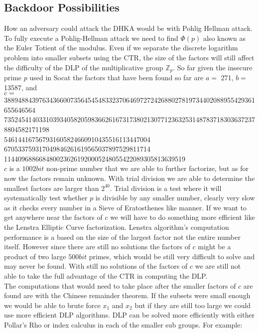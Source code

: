 \documentclass[letterpaper,11pt,notitlepage,fleqn]{article}
\begin{document}
\subsection{Backdoor Possibilities}
\noindent How an adversary could attack the DHKA would be with Pohlig Hellman attack.\\
\indent To fully execute a Pohlig-Hellman attack we need to find $\Phi(p)$ also known as the Euler Totient of the modulus. Even if we separate the discrete logarithm problem into smaller subsets using the CTR, the size of the factors will still affect the difficulty of the DLP of the multiplicative group $\mathbb{Z}_{p}$. So far given the insecure prime $p$ used in Socat the factors that have been found so far are $a =$ 271, $b =$ 13587, and 
\\$c =$
388948843976343660073564545483323706469727242688027819734402088955429361655646564 \\
7352454140331039340582059836626167317380213077123632531487837183036372378804582171198 \\
546144167567931605824660910435516113447004 670533759317049846261619565037897529811714 \\
1144096886684800236261920005248055422089305813639519 \\ 
$c$ is a $1002 bit$ non-prime number that we are able to further factorize, but as for now the factors remain unknown. With trial division we are able to determine the smallest factors are larger than $2^40$. Trial division is a test where it will systematically test whether $p$ is divisible by any smaller number, clearly very slow as it checks every number in a Sieve of Eratosthenes like manner. If we want to get anywhere near the factors of $c$ we will have to do something more efficient
like the Lenstra Elliptic Curve factorization. Lenstra algorithm's computation performance is a based on the size of the largest factor not the entire number itself.  However since there are still no solutions the factors of $c$ might be a product of two large $500 bit$ primes, which would be still very difficult to solve and may never be found. With still no solutions of the factors of $c$ we are still not able to take the full advantage of the CTR in computing the DLP. 
\\
The computations that would need to take place after the smaller factors of $c$ are found are with the Chinese remainder theorem. If the subsets were small enough we would be able to brute force $x_{1}$ and $x_{2}$ but if they are still too large we could use more efficient DLP algorithms. DLP can be solved more efficiently with either Pollar's Rho or index calculus in each of the smaller sub groups. For example:\\
\end{document}
